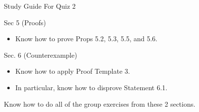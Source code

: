 \documentclass[10pt]{beamer}
\begin{document}
%
%
%			


\begin{frame}{Study Guide For Quiz 2}


\begin{myredbox}[title=Readings (1 question)]
Sec 5 (Proofs)
\begin{itemize}
\item Know how to prove Props 5.2, 5.3, 5.5, and 5.6.
\end{itemize}
Sec. 6 (Counterexample)
\begin{itemize}
\item Know how to apply Proof Template 3.
\item In particular, know how to disprove Statement 6.1. 
\end{itemize}

\end{myredbox}

\vfill 

\begin{myyellowbox}[title=Group exercises (2 questions)]
Know how to do all of the group exercises from these 2 sections.
\end{myyellowbox}

\end{frame}




\end{document}
